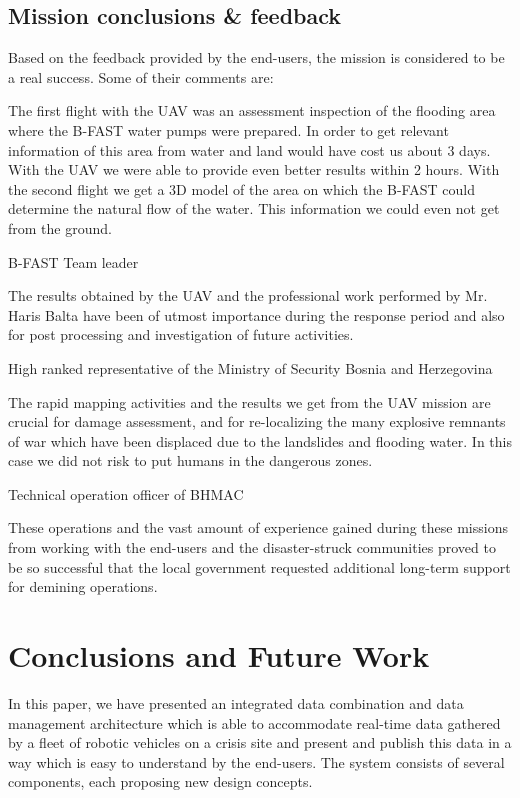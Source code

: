 \documentclass{article}
\begin{document}
\subsection{Mission conclusions \& feedback}
Based on the feedback provided by the end-users, the mission is considered to be a real success. Some of their comments are:
\setlength{\epigraphwidth}{.9\textwidth}
\epigraph{The first flight with the UAV was an assessment inspection of the flooding area where the B-FAST water pumps were prepared.
In order to get relevant information of this area from water and land would have cost us about 3 days.
With the UAV we were able to provide even better results within 2 hours.
With the second flight we get a 3D model of the area on which the B-FAST could determine the natural flow of the water. This information we could even not get from the ground.}{B-FAST Team leader}
\epigraph{The results obtained by the UAV and the professional work performed by Mr. Haris Balta have been of utmost importance during the response period and also for post processing and investigation of future activities. }{High ranked representative of the Ministry of Security Bosnia and Herzegovina}
\epigraph{The rapid mapping activities and the results we get from the UAV mission are crucial for damage assessment, and for re-localizing the many explosive remnants of war which have been displaced due to the landslides and flooding water. In this case we did not risk to put humans in the dangerous zones. }{Technical operation officer of BHMAC}

These operations and the vast amount of experience gained during these missions from working with the end-users and the disaster-struck communities proved to be so successful that the local government requested additional long-term support for demining operations.

\afterpage{\clearpage}

\section{Conclusions and Future Work}
In this paper, we have presented an integrated data combination and data management architecture which is able to accommodate real-time data gathered by a fleet of robotic vehicles on a crisis site and present and publish this data in a way which is easy to understand by the end-users. The system consists of several components, each proposing new design concepts.
\end{document}
